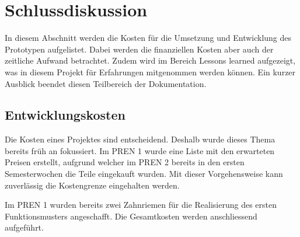 \newpage
\section{Schlussdiskussion}

In diesem Abschnitt werden die Kosten für die Umsetzung und Entwicklung des Prototypen aufgelistet. Dabei werden die finanziellen Kosten aber auch der zeitliche Aufwand betrachtet. Zudem wird im Bereich \glqq Lessons learned \grqq{} aufgezeigt, was in diesem Projekt für Erfahrungen mitgenommen werden können. Ein kurzer Ausblick beendet diesen Teilbereich der Dokumentation.

\subsection{Entwicklungskosten}

Die Kosten eines Projektes sind entscheidend. Deshalb wurde dieses Thema bereits früh an fokussiert. Im  PREN 1 wurde eine Liste mit den erwarteten Preisen erstellt, aufgrund welcher im PREN 2 bereits in den ersten Semesterwochen die Teile eingekauft wurden. Mit dieser Vorgehensweise kann zuverlässig die Kostengrenze eingehalten werden.

Im PREN 1 wurden bereits zwei Zahnriemen für die Realisierung des ersten Funktionsmusters angeschafft. Die Gesamtkosten werden anschliessend aufgeführt.

